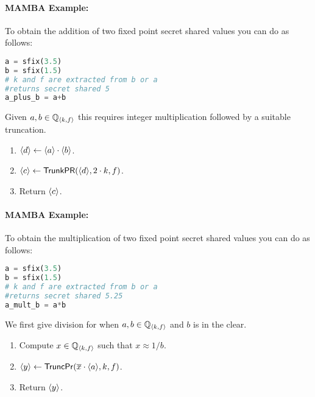   \paragraph{MAMBA Example:} To obtain the addition of two fixed point secret shared values you can do as follows:
  \begin{lstlisting}[language={python}]
a = sfix(3.5)
b = sfix(1.5)
# k and f are extracted from b or a
#returns secret shared 5
a_plus_b = a+b
\end{lstlisting}
  Given $a, b \in {\mathbb{Q}}_{\langle k, f \rangle}$ this requires integer multiplication followed
  by a suitable truncation.
  \begin{enumerate}
    \item $\langle d \rangle \leftarrow \langle a \rangle \cdot \langle b \rangle$.
    \item $\langle c \rangle \leftarrow \mathsf{TrunkPR}(\langle d \rangle,2 \cdot k,f)$.
    \item Return $\langle c \rangle$.
  \end{enumerate}
  \paragraph{MAMBA Example:} To obtain the multiplication of two fixed point secret shared values you can do as follows:
  \begin{lstlisting}[language={python}]
a = sfix(3.5)
b = sfix(1.5)
# k and f are extracted from b or a
#returns secret shared 5.25
a_mult_b = a*b
\end{lstlisting}

  We first give division for when $a, b \in {\mathbb{Q}}_{\langle k, f \rangle}$ and $b$ is in the clear.
  \begin{enumerate}
    \item Compute $x \in {\mathbb{Q}}_{\langle k, f \rangle}$ such that $x \approx 1/b$.
    \item $\langle y \rangle \leftarrow \mathsf{TruncPr}(\overline{x} \cdot \langle a \rangle,k,f)$.
    \item Return $\langle y \rangle$.
  \end{enumerate}

